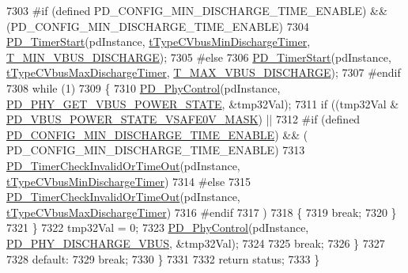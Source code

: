 \begin{DoxyCode}
7303 \textcolor{preprocessor}{#if (defined PD\_CONFIG\_MIN\_DISCHARGE\_TIME\_ENABLE) && (PD\_CONFIG\_MIN\_DISCHARGE\_TIME\_ENABLE)
}
7304 \textcolor{preprocessor}{}            \hyperlink{usb__pd__timer_8c_afa3b5394c429c185ea93be16ddb1545f}{PD\_TimerStart}(pdInstance, \hyperlink{usb__pd__timer_8h_a94e23fe7d4bf2bf6f8de1f51126d071fae1e72be49d715105618c5266d8348b7d}{tTypeCVbusMinDischargeTimer}, 
      \hyperlink{usb__pd__timer_8h_a290959f551e6b12818c09607ff90e9b4}{T\_MIN\_VBUS\_DISCHARGE});
7305 \textcolor{preprocessor}{#else
}
7306 \textcolor{preprocessor}{}            \hyperlink{usb__pd__timer_8c_afa3b5394c429c185ea93be16ddb1545f}{PD\_TimerStart}(pdInstance, \hyperlink{usb__pd__timer_8h_a94e23fe7d4bf2bf6f8de1f51126d071fa5d99688807a9cf008b7087f068dcee44}{tTypeCVbusMaxDischargeTimer}, 
      \hyperlink{usb__pd__timer_8h_a32e20656b2cbd8812656a7f1e3f917f0}{T\_MAX\_VBUS\_DISCHARGE});
7307 \textcolor{preprocessor}{#endif
}
7308 \textcolor{preprocessor}{}            \textcolor{keywordflow}{while} (1)
7309             \{
7310                 \hyperlink{usb__pd__policy_8c_a555b1880b5b259c3fdcd3da821e06cf2}{PD\_PhyControl}(pdInstance, 
      \hyperlink{group__usb__pd__phy__drv_ggab8bfca50e2ac042b47a697c88f84c3eda4a23adc388bf03852d850ff3919328d6}{PD\_PHY\_GET\_VBUS\_POWER\_STATE}, &tmp32Val);
7311                 \textcolor{keywordflow}{if} ((tmp32Val & \hyperlink{group__usb__pd__phy__drv_gabf05bb09647628f3556c817e1f059175}{PD\_VBUS\_POWER\_STATE\_VSAFE0V\_MASK}) ||
7312 #\textcolor{keywordflow}{if} (defined \hyperlink{usb__pd__config_8h_af713fdd823151fddb0577f3756deac17}{PD\_CONFIG\_MIN\_DISCHARGE\_TIME\_ENABLE}) && (
      PD\_CONFIG\_MIN\_DISCHARGE\_TIME\_ENABLE)
7313                     \hyperlink{usb__pd__timer_8c_a3d4072fbbc7b10a05c795eaf9ed33f5f}{PD\_TimerCheckInvalidOrTimeOut}(pdInstance, 
      \hyperlink{usb__pd__timer_8h_a94e23fe7d4bf2bf6f8de1f51126d071fae1e72be49d715105618c5266d8348b7d}{tTypeCVbusMinDischargeTimer})
7314 #\textcolor{keywordflow}{else}
7315                     \hyperlink{usb__pd__timer_8c_a3d4072fbbc7b10a05c795eaf9ed33f5f}{PD\_TimerCheckInvalidOrTimeOut}(pdInstance, 
      \hyperlink{usb__pd__timer_8h_a94e23fe7d4bf2bf6f8de1f51126d071fa5d99688807a9cf008b7087f068dcee44}{tTypeCVbusMaxDischargeTimer})
7316 #endif
7317                         )
7318                 \{
7319                     \textcolor{keywordflow}{break};
7320                 \}
7321             \}
7322             tmp32Val = 0;
7323             \hyperlink{usb__pd__policy_8c_a555b1880b5b259c3fdcd3da821e06cf2}{PD\_PhyControl}(pdInstance, \hyperlink{group__usb__pd__phy__drv_ggab8bfca50e2ac042b47a697c88f84c3edae705da68d4de3104b6852d84715bb71b}{PD\_PHY\_DISCHARGE\_VBUS}, &tmp32Val);
7324 
7325             \textcolor{keywordflow}{break};
7326         \}
7327 
7328         \textcolor{keywordflow}{default}:
7329             \textcolor{keywordflow}{break};
7330     \}
7331 
7332     \textcolor{keywordflow}{return} status;
7333 \}
\end{DoxyCode}


